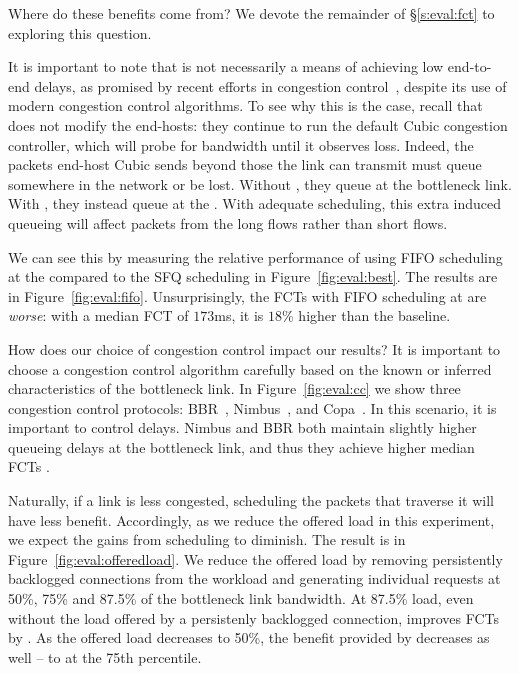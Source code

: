 Where do these benefits come from? We devote the remainder of \S\ref{s:eval:fct} to exploring this question.

 It is important to note that \name is not necessarily a means of achieving low end-to-end delays, as promised by recent efforts in congestion control~\cite{copa, nimbus}, despite its use of modern congestion control algorithms. 
To see why this is the case, recall that \name does not modify the end-hosts: they continue to run the default Cubic congestion controller, which will probe for bandwidth until it observes loss.
Indeed, the packets end-host Cubic sends beyond those the link can transmit must queue somewhere in the network or be lost. Without \name, they queue at the bottleneck link.
With \name, they instead queue at the \inbox.
With adequate scheduling, this extra induced queueing will affect packets from the long flows rather than short flows.



We can see this by measuring the relative performance of using FIFO scheduling at the \name compared to the SFQ scheduling in Figure~\ref{fig:eval:best}.
The results are in Figure~\ref{fig:eval:fifo}. 
Unsurprisingly, the FCTs with FIFO scheduling at \name are \emph{worse}: with a median FCT of $173$ms, it is $18$\% higher than the baseline.

 How does our choice of congestion control impact our results? 
It is important to choose a congestion control algorithm carefully based on the known or inferred characteristics of the bottleneck link. 
In Figure~\ref{fig:eval:cc} we show three congestion control protocols: BBR~\cite{bbr}, Nimbus~\cite{nimbus}, and Copa~\cite{copa}.
In this scenario, it is important to control delays. Nimbus and BBR both maintain slightly higher queueing delays at the bottleneck link, and thus they achieve higher median FCTs .



 Naturally, if a link is less congested, scheduling the packets that traverse it will have less benefit. Accordingly, as we reduce the offered load in this experiment, we expect the gains from scheduling to diminish. The result is in Figure~\ref{fig:eval:offeredload}. We reduce the offered load by removing persistently backlogged connections from the workload and generating individual requests at 50\%, 75\% and 87.5\% of the bottleneck link bandwidth. 
At 87.5\% load, even without the load offered by a persistenly backlogged connection, \name improves FCTs by . 
As the offered load decreases to 50\%, the benefit provided by \name decreases as well -- to  at the 75th percentile.

